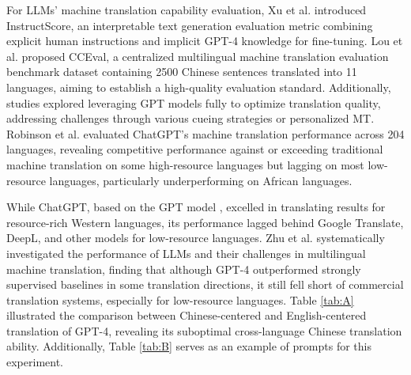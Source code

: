 \documentclass[acmsmall]{acmart}
\begin{document}
For LLMs' machine translation capability evaluation, Xu et al. \cite{xu} introduced InstructScore, an interpretable text generation evaluation metric combining explicit human instructions and implicit GPT-4 knowledge for fine-tuning. Lou et al. \cite{Lianzhang} proposed CCEval, a centralized multilingual machine translation evaluation benchmark dataset containing 2500 Chinese sentences translated into 11 languages, aiming to establish a high-quality evaluation standard. Additionally, studies \cite{Keqin} explored leveraging GPT models fully to optimize translation quality, addressing challenges through various cueing strategies or personalized MT. Robinson et al. \cite{Nathaniel} evaluated ChatGPT's machine translation performance across 204 languages, revealing competitive performance against or exceeding traditional machine translation on some high-resource languages but lagging on most low-resource languages, particularly underperforming on African languages.

While ChatGPT, based on the GPT model \cite{jiao2023chatgpt}, excelled in translating results for resource-rich Western languages, its performance lagged behind Google Translate, DeepL, and other models for low-resource languages. Zhu et al. \cite{Wenhao} systematically investigated the performance of LLMs and their challenges in multilingual machine translation, finding that although GPT-4 outperformed strongly supervised baselines in some translation directions, it still fell short of commercial translation systems, especially for low-resource languages. Table \ref{tab:A} illustrated the comparison between Chinese-centered and English-centered translation of GPT-4, revealing its suboptimal cross-language Chinese translation ability. Additionally, Table \ref{tab:B} serves as an example of prompts for this experiment.

\end{document}
